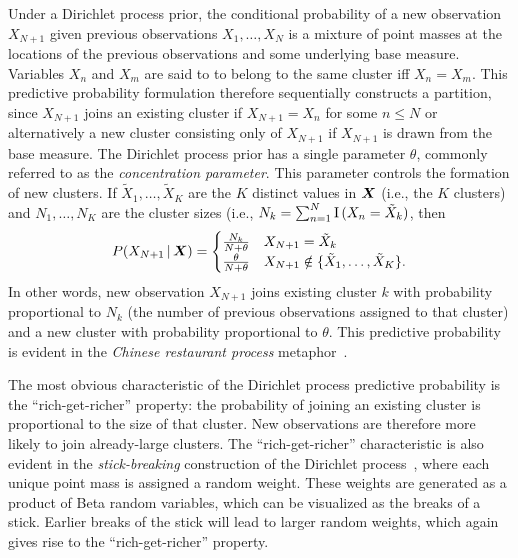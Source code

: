 \documentclass{article}
\begin{document}
Under a Dirichlet process prior, the conditional probability of a new
observation $X_{N+1}$ given previous observations $X_1, \ldots, X_N$ is a mixture of point
masses at the locations of the previous observations
and some underlying base measure. Variables $X_n$ and $X_m$ are
said to to belong to the same cluster iff $X_n = X_m$. This predictive
probability formulation therefore sequentially constructs a partition,
since $X_{N+1}$ joins an existing cluster if $X_{N + 1} = X_n$ for
some $n \leq N$ or alternatively a new cluster consisting only of
$X_{N+1}$ if $X_{N+1}$ is drawn from the base measure. The Dirichlet
process prior has a single parameter $\theta$, commonly referred to as
the \emph{concentration parameter}. This parameter controls the
formation of new clusters. If $\tilde{X}_1, \ldots, \tilde{X}_K$ are
the $K$ distinct values in $\boldsymbol{X}$ (i.e., the $K$ clusters) and $N_1,
\ldots, N_K$ are the cluster sizes (i.e., $N_k = \sum_{n=1}^N {\rm
  I}\, (X_n = \tilde{X}_k)$, then
\begin{equation}
P(X_{N+1} \,|\, \boldsymbol{X}) = \begin{cases}
\frac{N_k}{N + \theta} & X_{N + 1} = \tilde{X}_k\\
\frac{\theta}{N + \theta} & X_{N + 1} \notin \{\tilde{X}_1, \ldots,
\tilde{X}_K\}.
\end{cases}
\label{DPrule}
\end{equation}
In other words, new observation $X_{N+1}$ joins existing cluster $k$
with probability proportional to $N_k$ (the number of previous
observations assigned to that cluster) and a new cluster with
probability proportional to $\theta$. This predictive probability is
evident in the \emph{Chinese restaurant process}
metaphor~\cite{aldous85exchangeability}.

The most obvious characteristic of the Dirichlet process predictive
probability is the ``rich-get-richer'' property: the probability of
joining an existing cluster is proportional to the size of that
cluster. New observations are therefore more likely to join
already-large clusters. The ``rich-get-richer'' characteristic is also
evident in the \emph{stick-breaking} construction of the Dirichlet
process~\cite{Set94,IshJam01}, where each unique point mass is
assigned a random weight. These weights are generated as a product of
Beta random variables, which can be visualized as the breaks of a
stick. Earlier breaks of the stick will lead to larger random weights,
which again gives rise to the ``rich-get-richer'' property.
\end{document}

